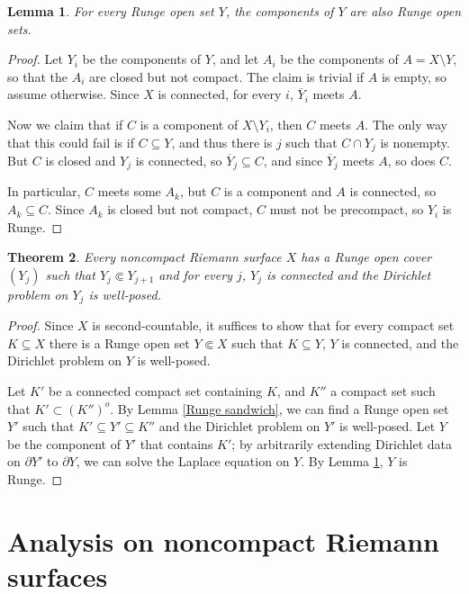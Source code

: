 \documentclass[reqno,12pt,letterpaper]{amsart}
\newtheorem{theorem}{Theorem}[section]
\newtheorem{lemma}[theorem]{Lemma}
\theoremstyle{definition}
\begin{document}
\begin{lemma}
\label{connected component of Runge}
For every Runge open set $Y$, the components of $Y$ are also Runge open sets.
\end{lemma}
\begin{proof}
Let $Y_i$ be the components of $Y$, and let $A_i$ be the components of $A = X \setminus Y$, so that the $A_i$ are closed but not compact.
The claim is trivial if $A$ is empty, so assume otherwise.
Since $X$ is connected, for every $i$, $\overline Y_i$ meets $A$.

Now we claim that if $C$ is a component of $X \setminus Y_i$, then $C$ meets $A$.
The only way that this could fail is if $C \subseteq Y$, and thus there is $j$ such that $C \cap Y_j$ is nonempty.
But $C$ is closed and $Y_j$ is connected, so $\overline Y_j \subseteq C$, and since $\overline Y_j$ meets $A$, so does $C$.

In particular, $C$ meets some $A_k$, but $C$ is a component and $A$ is connected, so $A_k \subseteq C$.
Since $A_k$ is closed but not compact, $C$ must not be precompact, so $Y_i$ is Runge.
\end{proof}

\begin{theorem}
\label{Runge open covers}
Every noncompact Riemann surface $X$ has a Runge open cover $(Y_j)$ such that $Y_j \Subset Y_{j+1}$ and for every $j$, $Y_j$ is connected and the Dirichlet problem on $Y_j$ is well-posed.
\end{theorem}
\begin{proof}
Since $X$ is second-countable, it suffices to show that for every compact set $K \subseteq X$ there is a Runge open set $Y \Subset X$ such that $K \subseteq Y$, $Y$ is connected, and the Dirichlet problem on $Y$ is well-posed.

Let $K'$ be a connected compact set containing $K$, and $K''$ a compact set such that $K' \subset (K'')^o$.
By Lemma \ref{Runge sandwich}, we can find a Runge open set $Y'$ such that $K' \subseteq Y' \subseteq K''$ and the Dirichlet problem on $Y'$ is well-posed.
Let $Y$ be the component of $Y'$ that contains $K'$; by arbitrarily extending Dirichlet data on $\partial Y'$ to $\partial Y$, we can solve the Laplace equation on $Y$.
By Lemma \ref{connected component of Runge}, $Y$ is Runge.
\end{proof}

\section{Analysis on noncompact Riemann surfaces}
\end{document}
